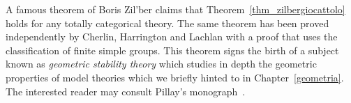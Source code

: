\documentclass[creche.tex]{subfiles}
\begin{document}
A famous theorem of Boris Zil'ber claims that Theorem~\ref{thm_zilbergiocattolo} holds for any totally categorical theory.
The same theorem has been proved independently by  Cherlin, Harrington and Lachlan with a proof that uses the classification of finite simple groups.
This theorem signs the birth of a subject known as \textit{geometric stability theory\/} which studies in depth the geometric properties of model theories which we briefly hinted to in Chapter~\ref{geometria}.
The interested reader may consult Pillay's monograph~\cite{Pillay}.

\begin{biblist}[]\normalsize


   
\end{biblist}
\end{document}
